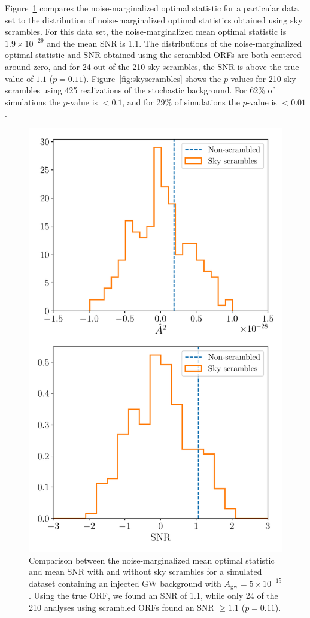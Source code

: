\documentclass[twocolumn,aps,prd,superscriptaddress]{revtex4-1}
\newcommand{\Agw}{\ensuremath{A_\mathrm{gw}}}
\begin{document}
Figure~\ref{fig:skyscrambles_dataset_sample} compares the noise-marginalized optimal statistic 
for a particular data set to the distribution of noise-marginalized optimal statistics obtained using sky scrambles. 
For this data set, the noise-marginalized mean optimal statistic is 
$1.9\times10^{-29}$ and the mean SNR is 1.1. 
The distributions of the noise-marginalized optimal statistic and SNR obtained using the scrambled ORFs 
are both centered around zero, 
and for 24 out of the 210 sky scrambles, the SNR is above the true value of $1.1$ ($p=0.11$). 
Figure~\ref{fig:skyscrambles} shows the $p$-values for 210 sky scrambles 
using 425 realizations of the stochastic background. 
For 62\% of simulations the $p$-value is $<0.1$, and for 29\% of simulations the $p$-value is $<0.01$.
\begin{figure}[htb]
	\includegraphics[width=0.95\columnwidth]{plots/skyscrambles_dataset50.pdf}
	\caption{Comparison between the noise-marginalized mean optimal statistic and mean SNR 
			with and without sky scrambles for a simulated dataset 
			containing an injected GW background with $\Agw = 5\times10^{-15}$. 
			Using the true ORF, we found an SNR of 1.1, while only 24 of the 210 analyses using scrambled ORFs 
			found an SNR $\geq 1.1$ ($p=0.11$).}
	\label{fig:skyscrambles_dataset_sample}
\end{figure}
\end{document}
